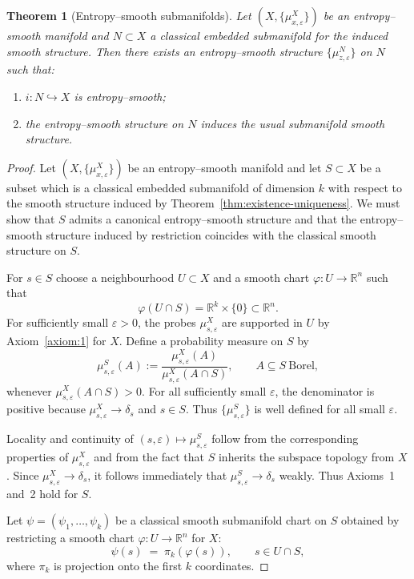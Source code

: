 \documentclass[11pt]{amsart}
\newtheorem{theorem}{Theorem}[section]
\theoremstyle{definition}
\theoremstyle{remark}
\begin{document}
\begin{theorem}[Entropy--smooth submanifolds]
\label{thm:submanifold}
Let $(X,\{\mu^X_{x,\varepsilon}\})$ be an entropy--smooth manifold and
$N\subset X$ a classical embedded submanifold for the induced smooth 
structure. Then there exists an entropy--smooth structure
$\{\mu^N_{z,\varepsilon}\}$ on $N$ such that:

\begin{enumerate}
\item $i:N\hookrightarrow X$ is entropy--smooth;
\item the entropy--smooth structure on $N$ induces the usual
submanifold smooth structure.
\end{enumerate}
\end{theorem}
\begin{proof}
Let $(X,\{\mu^{X}_{x,\varepsilon}\})$ be an entropy–smooth manifold and let 
$S\subset X$ be a subset which is a classical embedded submanifold of dimension $k$ 
with respect to the smooth structure induced by Theorem~\ref{thm:existence-uniqueness}.  
We must show that $S$ admits a canonical entropy–smooth structure and that the 
entropy–smooth structure induced by restriction coincides with the classical smooth 
structure on $S$.


For $s\in S$ choose a neighbourhood $U\subset X$ and a smooth chart 
$\varphi:U\to\mathbb{R}^n$ such that 
\[
\varphi(U\cap S)=\mathbb{R}^k\times\{0\}\subset\mathbb{R}^n.
\]
For sufficiently small $\varepsilon>0$, the probes $\mu^{X}_{s,\varepsilon}$ are 
supported in $U$ by Axiom~\ref{axiom:1} for $X$.  Define a probability measure on $S$ by
\[
\mu^{S}_{s,\varepsilon}(A)
:= \frac{\mu^{X}_{s,\varepsilon}(A)}{\mu^{X}_{s,\varepsilon}(A\cap S)},
\qquad A\subseteq S\ \text{Borel},
\]
whenever $\mu^{X}_{s,\varepsilon}(A\cap S)>0$.  
For all sufficiently small $\varepsilon$, the denominator is positive because 
$\mu^{X}_{s,\varepsilon}\to\delta_s$ and $s\in S$.  
Thus $\{\mu^{S}_{s,\varepsilon}\}$ is well defined for all small $\varepsilon$.

Locality and continuity of $(s,\varepsilon)\mapsto\mu^{S}_{s,\varepsilon}$ follow 
from the corresponding properties of $\mu^{X}_{s,\varepsilon}$ and from the fact 
that $S$ inherits the subspace topology from $X$.  
Since $\mu^{X}_{s,\varepsilon}\to\delta_s$, it follows immediately that 
$\mu^{S}_{s,\varepsilon}\to\delta_s$ weakly.  
Thus Axioms~1 and~2 hold for $S$.

Let $\psi=(\psi_1,\dots,\psi_k)$ be a classical smooth submanifold chart on $S$ 
obtained by restricting a smooth chart $\varphi:U\to\mathbb{R}^n$ for $X$:
\[
\psi(s) \;=\; \pi_k(\varphi(s)),
\qquad s\in U\cap S,
\]
where $\pi_k$ is projection onto the first $k$ coordinates.


\end{proof}
\end{document}
